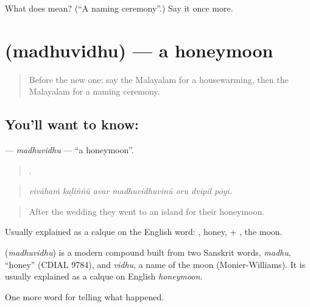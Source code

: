 \begin{tcolorbox}[breakable,colback=teal!4,colframe=teal!35!black,title={Before you move on}]
What does  mean? (\textquotedblleft{}A naming ceremony\textquotedblright{}.) Say it once more.
\end{tcolorbox}
\section[\texorpdfstring{\ml{മധുവിധു} (madhuvidhu)}{മധുവിധു (madhuvidhu)}]{ (madhuvidhu) — a honeymoon}

\label{lesson:ML-C389-madhuvidhu}



\begin{quote}
Before the new one: say the Malayalam for a housewarming, then the Malayalam for a naming ceremony.
\end{quote}

\subsection*{You'll want to know: }
\textbf{} — \emph{madhuvidhu} — \textquotedblleft{}a honeymoon\textquotedblright{}.

\begin{quote}
      .
\end{quote}

\begin{quote}
\emph{vivāhaṁ kaḻiññŭ avar madhuvidhuvinŭ oru dvīpil pōyi.}
\end{quote}

\begin{quote}
After the wedding they went to an island for their honeymoon.
\end{quote}

Usually explained as a calque on the English word: , honey, + , the moon.

\begin{cousinweb}
\textbf{} (\emph{madhuvidhu}) is a modern compound built from two Sanskrit words, \emph{madhu}, \textquotedblleft{}honey\textquotedblright{} (CDIAL 9784), and \emph{vidhu}, a name of the moon (Monier-Williams). It is usually explained as a calque on English \emph{honeymoon}.
\end{cousinweb}

\begin{grammarlens}[title={What you've built}]
One more word for telling what happened.
\end{grammarlens}

